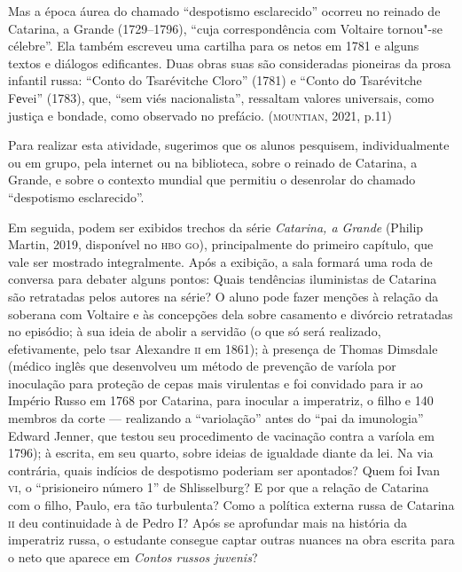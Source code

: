\documentclass[11pt]{extarticle}
\begin{document}
Mas a época áurea do chamado ``despotismo esclarecido'' ocorreu no reinado
de Catarina, a Grande (1729--1796), ``cuja correspondência com Voltaire
tornou"-se célebre''. Ela também escreveu uma cartilha para os netos em
1781 e alguns textos e diálogos edificantes. Duas obras suas são
consideradas pioneiras da prosa infantil russa: ``Conto do Tsarévitche
Cloro'' (1781) e ``Conto dо Tsarévitche Fеvei'' (1783),
que, ``sem viés nacionalista'', ressaltam valores universais, como
justiça e bondade, como observado no prefácio. (\textsc{mountian}, 2021, p.11)

Para realizar esta atividade, sugerimos que os alunos pesquisem,
individualmente ou em grupo, pela internet ou na biblioteca, sobre o
reinado de Catarina, a Grande, e sobre o contexto mundial que permitiu o
desenrolar do chamado ``despotismo esclarecido''.


Em seguida, podem ser exibidos trechos da série \emph{Catarina, a
Grande} (Philip Martin, 2019, disponível no \textsc{hbo go}), principalmente do
primeiro capítulo, que vale ser mostrado integralmente. Após a exibição,
a sala formará uma roda de conversa para debater alguns pontos: Quais
tendências iluministas de Catarina são retratadas pelos autores na
série? O aluno pode fazer menções à relação da soberana com Voltaire e
às concepções dela sobre casamento e divórcio retratadas no episódio; à
sua ideia de abolir a servidão (o que só será realizado, efetivamente,
pelo tsar Alexandre \textsc{ii} em 1861); à presença de Thomas Dimsdale (médico
inglês que desenvolveu um método de prevenção de varíola por inoculação
para proteção de cepas mais virulentas e foi convidado para ir ao
Império Russo em 1768 por Catarina, para inocular a imperatriz, o filho
e 140 membros da corte --- realizando a ``variolação'' antes do ``pai da
imunologia'' Edward Jenner, que testou seu procedimento de vacinação
contra a varíola em 1796); à escrita, em seu quarto, sobre ideias de
igualdade diante da lei. Na via contrária, quais indícios de despotismo
poderiam ser apontados? Quem foi Ivan \textsc{vi}, o ``prisioneiro número 1'' de
Shlisselburg? E por que a relação de Catarina com o filho, Paulo, era
tão turbulenta? Como a política externa russa de Catarina \textsc{ii} deu
continuidade à de Pedro I? Após se aprofundar mais na história da
imperatriz russa, o estudante consegue captar outras nuances na obra
escrita para o neto que aparece em \emph{Contos russos juvenis}?
\end{document}
